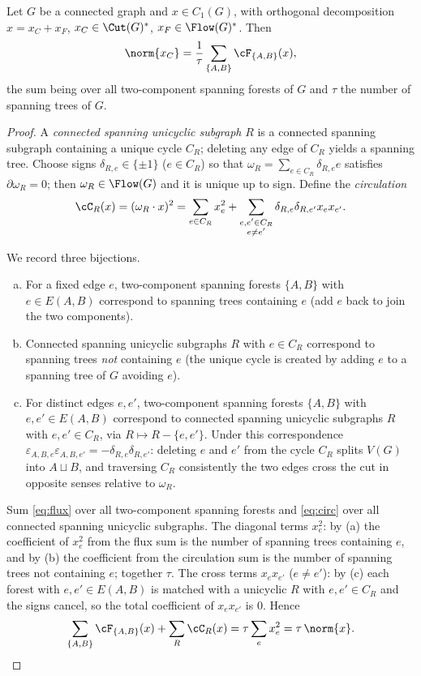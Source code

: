 \begin{lem}
\label{lem:length}
Let $G$ be a connected graph and $x\in C_1(G)$, with orthogonal decomposition
$x=x_C+x_F$, $x_C\in\Cut(G)^\ast$, $x_F\in\Flow(G)^\ast$.  Then
\[
\norm{x_C}=\frac1\tau\sum_{\{A,B\}}\cF_{\{A,B\}}(x),
\]
the sum being over all two-component spanning forests of $G$ and $\tau$ the number of
spanning trees of $G$.
\end{lem}

\begin{proof}
A \emph{connected spanning unicyclic subgraph} $R$ is a connected spanning subgraph
containing a unique cycle $C_R$; deleting any edge of $C_R$ yields a spanning tree.  Choose
signs $\delta_{R,e}\in\{\pm1\}$ ($e\in C_R$) so that
$\omega_R=\sum_{e\in C_R}\delta_{R,e}e$ satisfies $\partial\omega_R=0$; then
$\omega_R\in\Flow(G)$ and it is unique up to sign.  Define the \emph{circulation}
\begin{equation}
\label{eq:circ}
\cC_R(x)=(\omega_R\cdot x)^2
=\sum_{e\in C_R}x_e^2+\sum_{\substack{e,e'\in C_R\\ e\ne e'}}\delta_{R,e}\delta_{R,e'}x_ex_{e'} .
\end{equation}

We record three bijections.
\begin{enumerate}[(a)]
\item For a fixed edge $e$, two-component spanning forests $\{A,B\}$ with $e\in E(A,B)$
correspond to spanning trees containing $e$ (add $e$ back to join the two components).
\item Connected spanning unicyclic subgraphs $R$ with $e\in C_R$ correspond to spanning
trees \emph{not} containing $e$ (the unique cycle is created by adding $e$ to a spanning
tree of $G$ avoiding $e$).
\item For distinct edges $e,e'$, two-component spanning forests $\{A,B\}$ with
$e,e'\in E(A,B)$ correspond to connected spanning unicyclic subgraphs $R$ with
$e,e'\in C_R$, via $R\mapsto R-\{e,e'\}$.  Under this correspondence
$\varepsilon_{A,B,e}\varepsilon_{A,B,e'}=-\delta_{R,e}\delta_{R,e'}$: deleting $e$ and $e'$
from the cycle $C_R$ splits $V(G)$ into $A\sqcup B$, and traversing $C_R$ consistently the
two edges cross the cut in opposite senses relative to $\omega_R$.
\end{enumerate}

Sum \eqref{eq:flux} over all two-component spanning forests and \eqref{eq:circ} over all
connected spanning unicyclic subgraphs.  The diagonal terms $x_e^2$: by (a) the coefficient
of $x_e^2$ from the flux sum is the number of spanning trees containing $e$, and by (b) the
coefficient from the circulation sum is the number of spanning trees not containing $e$;
together $\tau$.  The cross terms $x_ex_{e'}$ ($e\ne e'$): by (c) each forest with
$e,e'\in E(A,B)$ is matched with a unicyclic $R$ with $e,e'\in C_R$ and the signs cancel,
so the total coefficient of $x_ex_{e'}$ is $0$.  Hence
\begin{equation}
\label{eq:full}
\sum_{\{A,B\}}\cF_{\{A,B\}}(x)+\sum_{R}\cC_R(x)=\tau\sum_e x_e^2=\tau\,\norm{x}.
\end{equation}


\end{proof}

